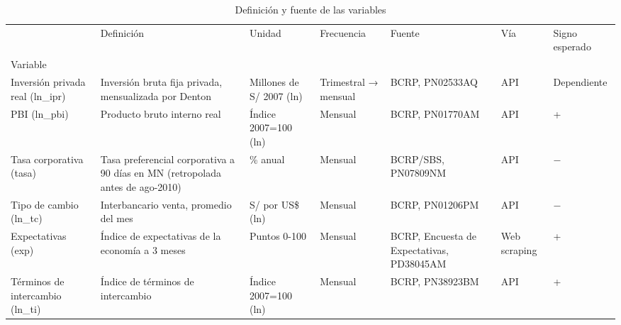 \begin{table}
\caption{Definición y fuente de las variables}
\label{tab:tabla1_variables}
\begin{tabular}{lllllll}
\toprule
 & Definición & Unidad & Frecuencia & Fuente & Vía & Signo esperado \\
Variable &  &  &  &  &  &  \\
\midrule
Inversión privada real (ln\_ipr) & Inversión bruta fija privada, mensualizada por Denton & Millones de S/ 2007 (ln) & Trimestral → mensual & BCRP, PN02533AQ & API & Dependiente \\
PBI (ln\_pbi) & Producto bruto interno real & Índice 2007=100 (ln) & Mensual & BCRP, PN01770AM & API & + \\
Tasa corporativa (tasa) & Tasa preferencial corporativa a 90 días en MN (retropolada antes de ago-2010) & \% anual & Mensual & BCRP/SBS, PN07809NM & API & − \\
Tipo de cambio (ln\_tc) & Interbancario venta, promedio del mes & S/ por US\$ (ln) & Mensual & BCRP, PN01206PM & API & − \\
Expectativas (exp) & Índice de expectativas de la economía a 3 meses & Puntos 0-100 & Mensual & BCRP, Encuesta de Expectativas, PD38045AM & Web scraping & + \\
Términos de intercambio (ln\_ti) & Índice de términos de intercambio & Índice 2007=100 (ln) & Mensual & BCRP, PN38923BM & API & + \\
\bottomrule
\end{tabular}
\end{table}
